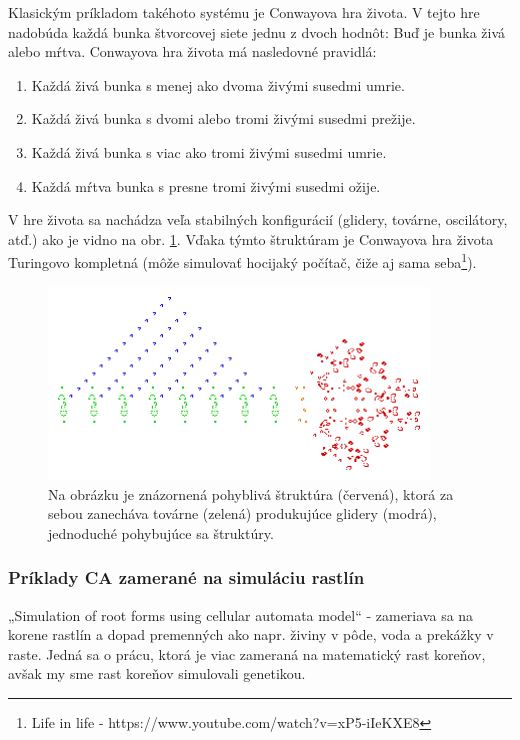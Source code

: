 \documentclass[12pt]{article}
\begin{document}
Klasickým príkladom takéhoto systému je Conwayova hra života. \cite{wiki:Conway's_Game_of_Life}
V tejto hre nadobúda každá bunka štvorcovej siete jednu z dvoch hodnôt:
Buď je bunka živá alebo mŕtva. Conwayova hra života má nasledovné pravidlá:

\begin{enumerate}
	\item Každá živá bunka s menej ako dvoma živými susedmi umrie.
	\item Každá živá bunka s dvomi alebo tromi živými susedmi prežije.
	\item Každá živá bunka s viac ako tromi živými susedmi umrie.
	\item Každá mŕtva bunka s presne tromi živými susedmi ožije.
\end{enumerate}

V hre života sa nachádza veľa stabilných konfigurácií (glidery, továrne,
oscilátory, atď.) ako je vidno na obr. \ref{obr:conwayova hra zivota}.
Vďaka týmto štruktúram je Conwayova hra života Turingovo kompletná (môže
simulovať hocijaký počítač, čiže aj sama seba\footnote
{Life in life - https://www.youtube.com/watch?v=xP5-iIeKXE8}).

\begin{figure}[ht]
	\centering
	\includegraphics[width=0.9\textwidth]{res/Conways_game_of_life_breeder.png}
	\caption{Na obrázku je znázornená pohyblivá štruktúra (červená), ktorá
		za sebou zanecháva továrne (zelená) produkujúce glidery (modrá),
		jednoduché pohybujúce sa štruktúry.}
	\label{obr:conwayova hra zivota}
\end{figure}

\subsubsection{Príklady CA zamerané na simuláciu rastlín}

„Simulation of root forms using cellular automata model“ - zameriava sa na
korene rastlín a dopad premenných ako napr. živiny v pôde, voda a prekážky
v raste. Jedná sa o prácu, ktorá je viac zameraná na matematický rast koreňov,
avšak my sme rast koreňov simulovali genetikou.
\end{document}
